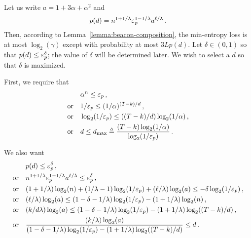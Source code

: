   Let us write $a = 1 + 3 \alpha + \alpha^2$ 
  and 
  $$
    p(d) = n^{1+1/\lambda} \mathsf{\varepsilon}_p^{1 - 1/\lambda} a^{\ell/\lambda}
    \,.
  $$
  Then, according to Lemma~\ref{lemma:beacon-composition}, 
  the min-entropy loss is at most $\log_2(\gamma)$ 
  except with probability at most $3 L p(d)$. 
  Let $\delta \in (0, 1)$ so that $p(d) \leq \mathsf{\varepsilon}_p^\delta$; 
  the value of $\delta$ will be determined later. 
  We wish to select a $d$ so that $\delta$ is maximized.

  First, we require that 
  \begin{align*}
    &\alpha^n \leq \mathsf{\varepsilon}_p\,,\\
    \text{or}\quad &
      1/\mathsf{\varepsilon}_p \leq (1/\alpha)^{(T - k)/d}\,,\\
    \text{or}\quad &
      \log_2(1/\mathsf{\varepsilon}_p) \leq ((T - k)/d)\log_2(1/\alpha)\,,\\
    \text{or}\quad &
      d \leq d_\mathrm{max} \triangleq \frac{(T - k)\log_2(1/\alpha)}{\log_2(1/\mathsf{\varepsilon}_p)}
      \,.
  \end{align*}

  We also want 
  \begin{align*}
    &p(d) \leq \mathsf{\varepsilon}_p^{\delta}\,,\\
    \text{or}\quad &
      n^{1+1/\lambda} \mathsf{\varepsilon}_p^{1 - 1/\lambda} a^{\ell/\lambda} \leq \mathsf{\varepsilon}_p^\delta \,,\\
    \text{or}\quad &
      (1+1/\lambda)\log_2(n)
      + (1/\lambda - 1)\log_2(1/\mathsf{\varepsilon}_p) 
      + (\ell/\lambda) \log_2(a) \leq -\delta \log_2(1/\mathsf{\varepsilon}_p) \,,\\
    \text{or}\quad &      
      (\ell/\lambda) \log_2(a) \leq (1-\delta - 1/\lambda) \log_2(1/\mathsf{\varepsilon}_p) - (1+1/\lambda)\log_2(n)\,,\\
    \text{or}\quad &      
      (k/d\lambda) \log_2(a) \leq (1-\delta - 1/\lambda) \log_2(1/\mathsf{\varepsilon}_p) - (1+1/\lambda)\log_2((T-k)/d)\,,\\
    \text{or}\quad &      
      \frac{(k/\lambda) \log_2(a)}{(1-\delta - 1/\lambda) \log_2(1/\mathsf{\varepsilon}_p) - (1+1/\lambda)\log_2((T-k)/d)} \leq d
      \,.
  \end{align*}
  
